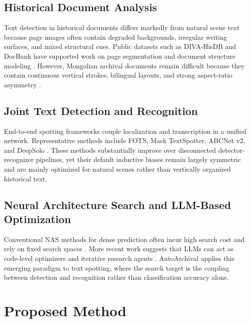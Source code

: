 \documentclass[a4paper,fleqn,longmktitle]{cas-sc}
\begin{document}
\subsection{Historical Document Analysis}

Text detection in historical documents differs markedly from natural scene text because page images often contain degraded backgrounds, irregular writing surfaces, and mixed structural cues. Public datasets such as DIVA-HisDB and DocBank have supported work on page segmentation and document structure modeling \cite{alberti2017historical,li2020docbank}. However, Mongolian archival documents remain difficult because they contain continuous vertical strokes, bilingual layouts, and strong aspect-ratio asymmetry \cite{gao2021offline,yuan2021novel,zhao2022robust}.

\subsection{Joint Text Detection and Recognition}

End-to-end spotting frameworks couple localization and transcription in a unified network. Representative methods include FOTS, Mask TextSpotter, ABCNet v2, and DeepSolo \cite{liu2018fots,liao2020mask,liu2021abcnet,ye2023deepsolo}. These methods substantially improve over disconnected detector-recognizer pipelines, yet their default inductive biases remain largely symmetric and are mainly optimized for natural scenes rather than vertically organized historical text.

\subsection{Neural Architecture Search and LLM-Based Optimization}

Conventional NAS methods for dense prediction often incur high search cost and rely on fixed search spaces \cite{zoph2017neural,cai2019proxylessnas,liu2019darts,pham2018efficient,he2021automl}. More recent work suggests that LLMs can act as code-level optimizers and iterative research agents \cite{yang2024large,wang2023voyager,yao2023react,shinn2023reflexion}. AutoArchival applies this emerging paradigm to text spotting, where the search target is the coupling between detection and recognition rather than classification accuracy alone.

\section{Proposed Method}
\end{document}
